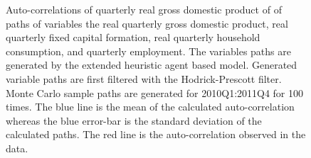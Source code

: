 \begin{figure}[h!]
    \centering
    
		\caption{Auto-correlations of quarterly real gross domestic product of of paths of variables the real quarterly gross domestic product, real quarterly fixed capital formation, real quarterly household consumption, and quarterly employment. The variables paths are generated by the extended heuristic agent based model. Generated variable paths are first filtered with the Hodrick-Prescott filter. Monte Carlo sample paths are generated for 2010Q1:2011Q4 for 100 times. The blue line is the mean of the calculated auto-correlation whereas the blue error-bar is the standard deviation of the calculated paths. The red line is the auto-correlation observed in the data. }
    \label{fig:autocorr-eh-abm}
\end{figure}

